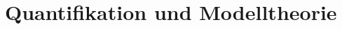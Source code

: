 \documentclass[handout,aspectratio=1610,dvipsnames]{beamer}
\begin{document}
  \section[Quantifikation und Modelltheorie]{Quantifikation und Modelltheorie}
  \let\woopsi\section\let\section\subsection\let\subsection\subsubsection
  
  \let\subsection\section\let\section\woopsi
\end{document}
